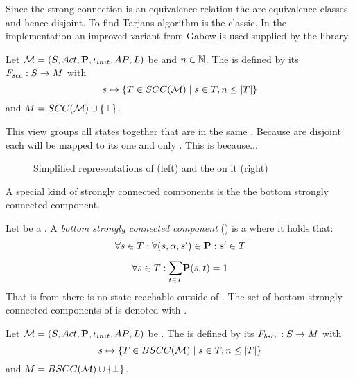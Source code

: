 \documentclass[preview]{standalone}
\begin{document}
Since the strong connection is an equivalence relation the \sccsN are equivalence classes and hence disjoint. To find \sccsN Tarjans algorithm is the classic. In the implementation an improved variant from Gabow is used supplied by the \jgrapht library. 

\begin{definition}
	Let ${{{\mathcal{M}}}} = {{({S}, {Act}, {\textbf{P}}, {\iota_{init}}, {AP}, {L})}}$ be \achgphN and $n \in {\mathbb{N}}$. The \viewN \viewscc is defined by its \grpfctN ${{F_{scc}}} : {S} \to {\ensuremath{{M}}}$ with
	\[
	{s} \mapsto \{{T} \in {SCC(\ensuremath{{{{\mathcal{M}}}}})} \mid {s} \in {T}, n \leq |{T}|\}
	\]
	and ${{M}} = {SCC({{{\mathcal{M}}}})} \cup {\{\bot\}}$.
\end{definition}

This view groups all states together that are in the same \sccN. Because \sccsN are disjoint each \state will be mapped to its one and only \sccN. This is because... 

\begin{figure}[h]
	\begin{minipage}{.55\textwidth}
		\hspace{5mm}
		
	\end{minipage}
	\begin{minipage}{.5\textwidth}
		
	\end{minipage}
		\caption{Simplified representations of \mdp (left) and the \viewN \viewscc on it (right)}
		\label{fig:sccMin2}  
\end{figure}

A special kind of strongly connected components is the the bottom strongly connected component.

\begin{definition}
	Let \scc be a \sccN. A \emph{bottom strongly connected component} (\bsccN) is a \sccN where it holds that: 
	\[
	\forall {s} \in {T} : \forall ({s}, {\alpha}, {s}') \in {\ensuremath{{\textbf{P}}}} : {s}' \in {T}
	\]
	\[
	\forall \state \in \scc : \bigsum{t \in \scc} \trans(\state, t) = 1
	\]
	That is from \scc there is no state reachable outside of \scc. The set of bottom strongly connected components of \chgph is denoted with \setbscc.
\end{definition}


\begin{definition}
	Let ${{{\mathcal{M}}}} = {{({S}, {Act}, {\textbf{P}}, {\iota_{init}}, {AP}, {L})}}$ be \achgphN. The \viewN \viewbscc is defined by its \grpfctN ${{F_{bscc}}} : {S} \to {\ensuremath{{M}}}$ with
	\[
	{s} \mapsto \{{T} \in {BSCC(\ensuremath{{{{\mathcal{M}}}}})} \mid {s} \in {T}, n \leq |{T}|\}
	\]
	and ${{M}} = {BSCC({{{\mathcal{M}}}})} \cup {\{\bot\}}$.
\end{definition}
\end{document}
